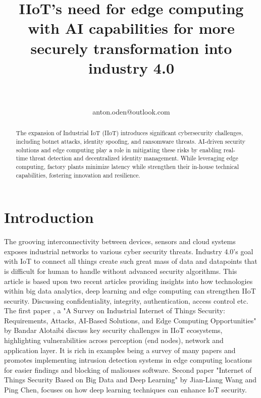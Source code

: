 \documentclass[article,a4paper]{IEEEtran}
\title{IIoT's need for edge computing with AI capabilities for more securely transformation into industry 4.0}
\author{
\IEEEauthorblockN{Anton Odén}\\
\IEEEauthorblockA{Dept. of Maths and Computer Science\\Karlstad University\\
651 88 KARLSTAD, Sweden}\\
anton.oden@outlook.com
}
\begin{document}
\maketitle

\begin{abstract}
    The expansion of Industrial IoT (IIoT) introduces significant cybersecurity challenges, including botnet attacks, identity spoofing, and ransomware threats. AI-driven security solutions and edge computing play a role in mitigating these risks by enabling real-time threat detection and decentralized identity management. While leveraging edge computing, factory plants minimize latency while strengthen their in-house technical capabilities, fostering innovation and resilience.
\end{abstract}

\tableofcontents

\section{Introduction}
The grooving interconnectivity between devices, sensors and cloud systems exposes industrial networks to various cyber security threats. Industry 4.0's goal with IoT to connect all things create such great mass of data and datapoints that is difficult for human to handle without advanced security algorithms. This article is based upon two recent articles providing insights into how technologies within big data analytics, deep learning and edge computing can strengthen IIoT security. Discussing confidentiality, integrity, authentication, access control etc.     
\newline\newline
The first paper \cite{SurveySecurity}, a "A Survey on Industrial Internet of Things Security: Requirements, Attacks, AI-Based Solutions, and Edge Computing Opportunities" by Bandar Alotaibi discuss key security challenges in IIoT ecosystems, highlighting vulnerabilities across perception (end nodes), network and application layer. It is rich in examples being a survey of many papers and promotes implementing intrusion detection systems in edge computing locations for easier findings and blocking of maliouses software.   
\newline\newline
Second paper \cite{Deeplearning} "Internet of Things Security Based on Big Data and Deep Learning" by Jian-Liang Wang and Ping Chen, focuses on how deep learning techniques can enhance IoT security. 
\end{document}

